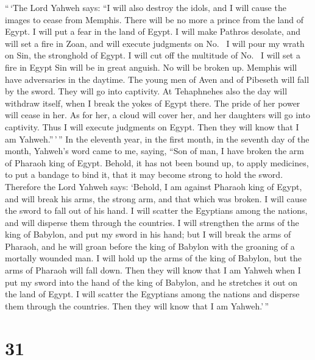  ``\,`The Lord Yahweh says: ``I will also destroy the
idols, and I will cause the images to cease from Memphis. There will be
no more a prince from the land of Egypt. I will put a fear in the land
of Egypt.  I will make Pathros desolate, and will set a
fire in Zoan, and will execute judgments on No.~ I will
pour my wrath on Sin, the stronghold of Egypt. I will cut off the
multitude of No.~ I will set a fire in Egypt Sin will be in
great anguish. No will be broken up. Memphis will have adversaries in
the daytime.  The young men of Aven and of Pibeseth will
fall by the sword. They will go into captivity.  At
Tehaphnehes also the day will withdraw itself, when I break the yokes of
Egypt there. The pride of her power will cease in her. As for her, a
cloud will cover her, and her daughters will go into captivity.
 Thus I will execute judgments on Egypt. Then they will
know that I am Yahweh.''\,'\,''  In the eleventh year, in
the first month, in the seventh day of the month, Yahweh's word came to
me, saying,  ``Son of man, I have broken the arm of Pharaoh
king of Egypt. Behold, it has not been bound up, to apply medicines, to
put a bandage to bind it, that it may become strong to hold the sword.
 Therefore the Lord Yahweh says: `Behold, I am against
Pharaoh king of Egypt, and will break his arms, the strong arm, and that
which was broken. I will cause the sword to fall out of his hand.
 I will scatter the Egyptians among the nations, and will
disperse them through the countries.  I will strengthen the
arms of the king of Babylon, and put my sword in his hand; but I will
break the arms of Pharaoh, and he will groan before the king of Babylon
with the groaning of a mortally wounded man.  I will hold
up the arms of the king of Babylon, but the arms of Pharaoh will fall
down. Then they will know that I am Yahweh when I put my sword into the
hand of the king of Babylon, and he stretches it out on the land of
Egypt.  I will scatter the Egyptians among the nations and
disperse them through the countries. Then they will know that I am
Yahweh.'\,''

\hypertarget{section-29}{%
\section{31}\label{section-29}}

